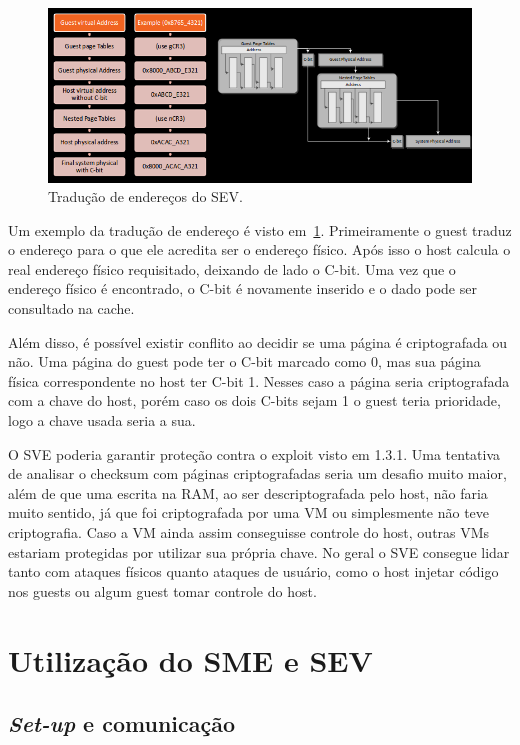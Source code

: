 \documentclass{report}
\begin{document}
\begin{figure}[h]
    \centering
    \includegraphics[width=1\textwidth]{img/sev-address-translation}
    \caption{Tradução de endereços do SEV\@.}\label{sev-address-translation}
\end{figure}

Um exemplo da tradução de endereço é visto em~\ref{sev-address-translation}.
Primeiramente o guest traduz o endereço para o que ele acredita ser o endereço
físico. Após isso o host calcula o real endereço físico requisitado, deixando
de lado o C-bit. Uma vez que o endereço físico é encontrado, o C-bit é
novamente inserido e o dado pode ser consultado na cache.

Além disso, é possível existir conflito ao decidir se uma página é
criptografada ou não. Uma página do guest pode ter o C-bit marcado como 0, mas
sua página física correspondente no host ter C-bit 1. Nesses caso a página
seria criptografada com a chave do host, porém caso os dois C-bits sejam 1 o
guest teria prioridade, logo a chave usada seria a sua.

O SVE poderia garantir proteção contra o exploit visto em 1.3.1. Uma tentativa
de analisar o checksum com páginas criptografadas seria um desafio muito maior,
além de que uma escrita na RAM, ao ser descriptografada pelo host, não faria
muito sentido, já que foi criptografada por uma VM ou simplesmente não teve
criptografia. Caso a VM ainda assim conseguisse controle do host, outras VMs
estariam protegidas por utilizar sua própria chave. No geral o SVE consegue
lidar tanto com ataques físicos quanto ataques de usuário, como o host injetar
código nos guests ou algum guest tomar controle do host.

\section{Utilização do SME e SEV}

\subsection{\textit{Set-up} e comunicação}
\end{document}

